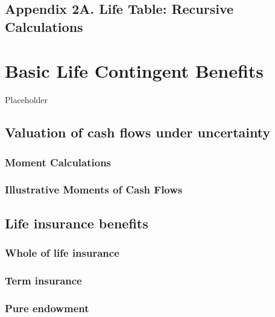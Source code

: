 \documentclass[
]{book}
\begin{document}
\hypertarget{Sec:LifeTableRecursive}{%
\section{Appendix 2A. Life Table: Recursive Calculations}\label{Sec:LifeTableRecursive}}

\hypertarget{C:SimpleBenefit}{%
\chapter{Basic Life Contingent Benefits}\label{C:SimpleBenefit}}

Placeholder

\hypertarget{Sec:BenefitCFunc}{%
\section{Valuation of cash flows under uncertainty}\label{Sec:BenefitCFunc}}

\hypertarget{moment-calculations}{%
\subsection{Moment Calculations}\label{moment-calculations}}

\hypertarget{illustrative-moments-of-cash-flows}{%
\subsection{Illustrative Moments of Cash Flows}\label{illustrative-moments-of-cash-flows}}

\hypertarget{Sec:BenefitActNot}{%
\section{Life insurance benefits}\label{Sec:BenefitActNot}}

\hypertarget{Sec:BenefitWL}{%
\subsection{Whole of life insurance}\label{Sec:BenefitWL}}

\hypertarget{Sec:BenefitTI}{%
\subsection{Term insurance}\label{Sec:BenefitTI}}

\hypertarget{pure-endowment}{%
\subsection{Pure endowment}\label{pure-endowment}}
\end{document}
